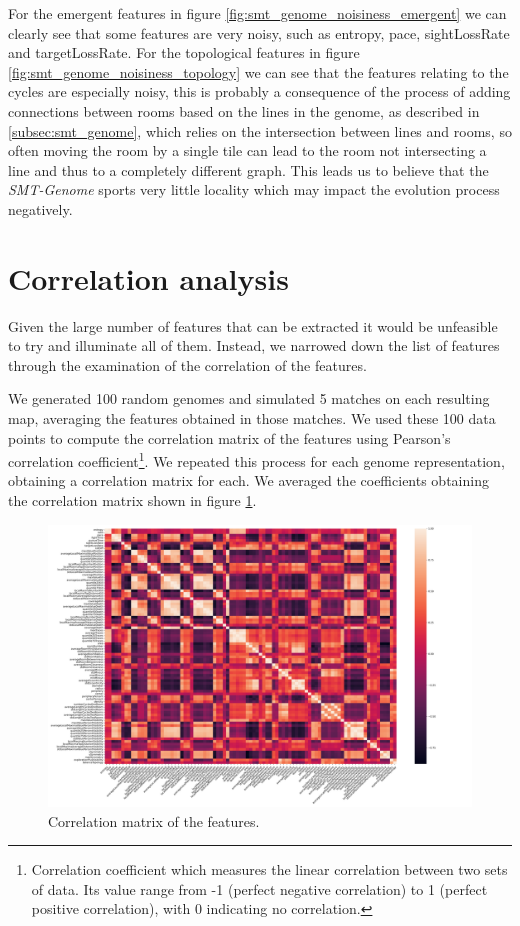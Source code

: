 \documentclass{Configuration_Files/PoliMi3i_thesis}
\begin{document}
For the emergent features in figure \ref{fig:smt_genome_noisiness_emergent} we can clearly see that some features are very noisy, such as entropy, pace, sightLossRate and targetLossRate. For the topological features in figure \ref{fig:smt_genome_noisiness_topology} we can see that the features relating to the cycles are especially noisy, this is probably a consequence of the process of adding connections between rooms based on the lines in the genome, as described in \ref{subsec:smt_genome}, which relies on the intersection between lines and rooms, so often moving the room by a single tile can lead to the room not intersecting a line and thus to a completely different graph. This leads us to believe that the \textit{SMT-Genome} sports very little locality which may impact the evolution process negatively.

\section{Correlation analysis}
Given the large number of features that can be extracted it would be unfeasible to  try and illuminate all of them. Instead, we narrowed down the list of features through the examination of the correlation of the features.

We generated 100 random genomes and simulated 5 matches on each resulting map, averaging the features obtained in those matches. We used these 100 data points to compute the correlation matrix of the features using Pearson's correlation coefficient\footnote{Correlation coefficient which measures the linear correlation between two sets of data. Its value range from -1 (perfect negative correlation) to 1 (perfect positive correlation), with 0 indicating no correlation.}. We repeated this process for each genome representation, obtaining a correlation matrix for each. We averaged the coefficients obtaining the correlation matrix shown in figure \ref{fig:correlation_matrix_full}.

\begin{figure}[hbt!]
    \centering
    \includegraphics[width=1.0\textwidth]{images/covariance_map_full.png}
    \caption{Correlation matrix of the features.}
    \label{fig:correlation_matrix_full}
\end{figure}
\end{document}
